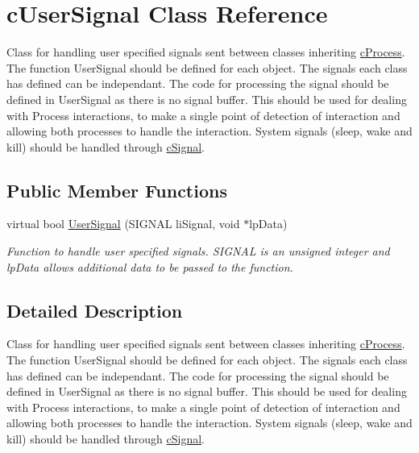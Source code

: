 \hypertarget{classc_user_signal}{
\section{cUserSignal Class Reference}
\label{classc_user_signal}
}


Class for handling user specified signals sent between classes inheriting \hyperlink{classc_process}{cProcess}. The function UserSignal should be defined for each object. The signals each class has defined can be independant. The code for processing the signal should be defined in UserSignal as there is no signal buffer. This should be used for dealing with Process interactions, to make a single point of detection of interaction and allowing both processes to handle the interaction. System signals (sleep, wake and kill) should be handled through \hyperlink{classc_signal}{cSignal}.  


\subsection*{Public Member Functions}
\begin{DoxyCompactItemize}
\item 
\hypertarget{classc_user_signal_a2f7ada3ca4ee80e2082e12a97b450221}{
virtual bool \hyperlink{classc_user_signal_a2f7ada3ca4ee80e2082e12a97b450221}{UserSignal} (SIGNAL liSignal, void $\ast$lpData)}
\label{classc_user_signal_a2f7ada3ca4ee80e2082e12a97b450221}

\begin{DoxyCompactList}\small\item\em Function to handle user specified signals. SIGNAL is an unsigned integer and lpData allows additional data to be passed to the function. \end{DoxyCompactList}\end{DoxyCompactItemize}


\subsection{Detailed Description}
Class for handling user specified signals sent between classes inheriting \hyperlink{classc_process}{cProcess}. The function UserSignal should be defined for each object. The signals each class has defined can be independant. The code for processing the signal should be defined in UserSignal as there is no signal buffer. This should be used for dealing with Process interactions, to make a single point of detection of interaction and allowing both processes to handle the interaction. System signals (sleep, wake and kill) should be handled through \hyperlink{classc_signal}{cSignal}. 